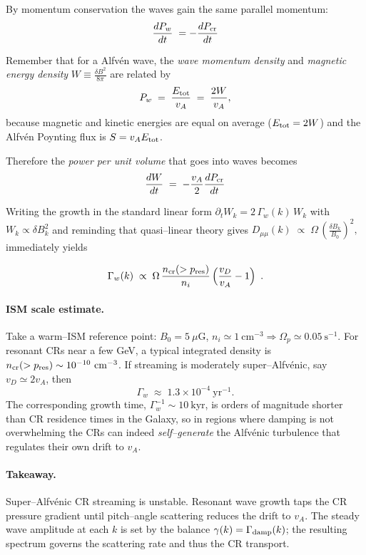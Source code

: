 By momentum conservation the waves gain the same parallel momentum:
\[
\frac{dP_{w}}{dt}\;=-\frac{dP_{\rm cr}}{dt}
\]

Remember that for a Alfv\'en wave, the \emph{wave momentum density} and \emph{magnetic energy
density} \( W \equiv \frac{\delta B^2}{8\pi}  \) are related by
\[
P_{w} \;=\; \frac{E_{\rm tot}}{v_A} \;=\; \frac{2W}{v_A},
\]
because magnetic and kinetic energies are equal on average (\(E_{\rm tot}=2W\)) and the Alfv\'en Poynting flux is \(S=v_A E_{\rm tot}\).

Therefore the \emph{power per unit volume} that goes into waves becomes
\[
\frac{dW}{dt}\;=\; -\frac{v_A}{2} \frac{dP_{\rm cr}}{dt}
\]

Writing the growth in the standard linear form
\(\partial_t W_k = 2\,\Gamma_w(k)\,W_k\) with \(W_k\propto \delta B_k^2\)
and reminding that quasi–linear theory gives
\(
D_{\mu\mu}(k) \;\propto\; \Omega\,\left(\frac{\delta B_k}{B_0}\right)^{\!2},
\)
immediately yields
\begin{remark}
\[
\Gamma_w(k)\;\propto\;\Omega\,
\frac{n_{\rm cr}(>p_{\rm res})}{n_i}\,
\Bigl(\frac{v_D}{v_A}-1\Bigr)\,~.
\]
\end{remark}

\paragraph{ISM scale estimate.}
Take a warm–ISM reference point: \(B_0=5~\mu\mathrm G\),
\(n_i\simeq 1~\mathrm{cm^{-3}}\Rightarrow \Omega_p\simeq 0.05~\mathrm{s^{-1}}\).
For resonant CRs near a few GeV, a typical integrated density is
\(n_{\rm cr}(>p_{\rm res})\sim 10^{-10}~\mathrm{cm^{-3}}\).
If streaming is moderately super–Alfv\'enic, say \(v_D\simeq 2v_A\), then
\[
\Gamma_w \;\approx\; 1.3\times10^{-4}~\mathrm{yr^{-1}}.
\]
The corresponding growth time, \( \Gamma_w^{-1}\sim 10~\mathrm{kyr}\), is orders of magnitude shorter than CR residence times in the Galaxy, so in regions
where damping is not overwhelming the CRs can indeed \emph{self–generate} the Alfv\'enic turbulence that regulates their own drift to \(v_A\).

\paragraph{Takeaway.}
Super–Alfv\'enic CR streaming is unstable. Resonant wave growth taps the CR pressure
gradient until pitch–angle scattering reduces the drift to \(v_A\). The steady wave
amplitude at each \(k\) is set by the balance \(\gamma(k)=\Gamma_{\rm damp}(k)\); the
resulting spectrum governs the scattering rate and thus the CR transport.

